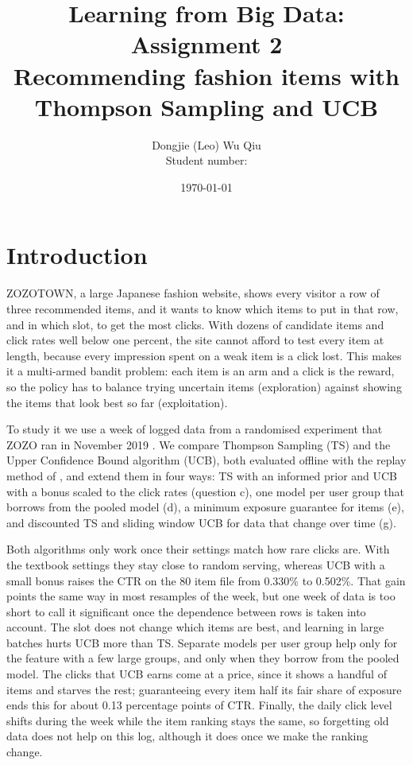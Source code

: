 \documentclass[11pt]{article}
\title{Learning from Big Data: Assignment 2\\[2pt]
       \large Recommending fashion items with Thompson Sampling and UCB}
\author{Dongjie (Leo) Wu Qiu\\ Student number: \studentnumber}
\date{\today}
\begin{document}
\maketitle

\section{Introduction}

ZOZOTOWN, a large Japanese fashion website, shows every visitor a row of three
recommended items, and it wants to know which items to put in that row, and
in which slot, to get the most clicks. With dozens of candidate items and
click rates well below one percent, the site cannot afford to test every item
at length, because every impression spent on a weak item is a click lost.
This makes it a multi-armed bandit problem: each item is an arm and a click
is the reward, so the policy has to balance trying uncertain items
(exploration) against showing the items that look best so far
(exploitation).

To study it we use a week of logged data from a randomised experiment that
ZOZO ran in November 2019 \citep{saito2021}. We compare Thompson Sampling
(TS) and the Upper Confidence Bound algorithm (UCB), both evaluated offline
with the replay method of \citet{li2011}, and extend them in four ways: TS
with an informed prior and UCB with a bonus scaled to the click rates
(question c), one model per user group that borrows from the pooled model
(d), a minimum exposure guarantee for items (e), and discounted TS and
sliding window UCB for data that change over time (g).

Both algorithms only work once their settings match how rare clicks are.
With the textbook settings they stay close to random serving, whereas UCB
with a small bonus raises the CTR on the 80 item file from 0.330\% to
0.502\%. That gain points the same way in most resamples of the week, but one
week of data is too short to call it significant once the dependence between
rows is taken into account. The slot does not change which items are best,
and learning in large batches hurts UCB more than TS. Separate models per
user group help only for the feature with a few large groups, and only when
they borrow from the pooled model. The clicks that UCB earns come at a price,
since it shows a handful of items and starves the rest; guaranteeing every
item half its fair share of exposure ends this for about 0.13 percentage
points of CTR. Finally, the daily click level shifts during the week while
the item ranking stays the same, so forgetting old data does not help on
this log, although it does once we make the ranking change.
\end{document}
